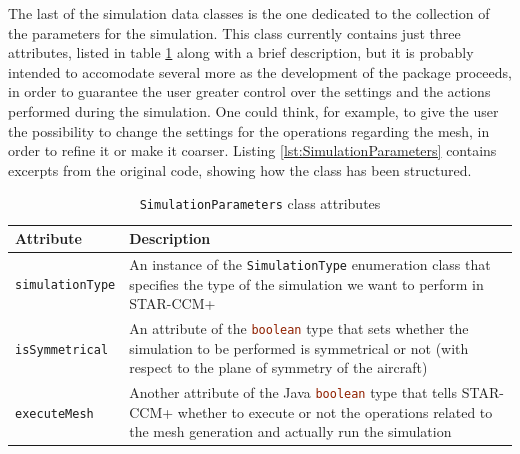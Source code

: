 The last of the simulation data classes is the one dedicated to the collection of the parameters for the simulation. This class currently contains just three attributes, listed in table \ref{tab:SimulationParameters} along with a brief description, but it is probably intended to accomodate several more as the development of the package proceeds, in order to guarantee the user greater control over the settings and the actions performed during the simulation. One could think, for example, to give the user the possibility to change the settings for the operations regarding the mesh, in order to refine it or make it coarser. Listing \ref{lst:SimulationParameters} contains excerpts from the original code, showing how the class has been structured.
%
\bigskip
\begin{table}[H]
\centering
\begin{tabular}{p{3.5cm}p{11.0cm}}
\toprule
\textbf{Attribute} & \textbf{Description} \\
\midrule
\lstinline[language=Java]!simulationType! & An instance of the \lstinline[language=Java]!SimulationType! enumeration class that specifies the type of the simulation we want to perform in STAR-CCM+ \\[0.2cm]
\lstinline[language=Java]!isSymmetrical! & An attribute of the \lstinline[language=Java]!boolean! type that sets whether the simulation to be performed is symmetrical or not (with respect to the plane of symmetry of the aircraft) \\[0.2cm]
\lstinline[language=Java]!executeMesh! & Another attribute of the Java \lstinline[language=Java]!boolean! type that tells STAR-CCM+ whether to execute or not the operations related to the mesh generation and actually run the simulation \\
\bottomrule
\end{tabular}
\caption{\lstinline[language=Java]!SimulationParameters! class attributes}
\label{tab:SimulationParameters}
\end{table}
% 
\bigskip
